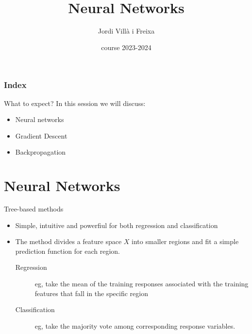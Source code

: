 \documentclass{beamer}
\title[Neural Networks]{Neural Networks} %
\author{Jordi Villà i Freixa} %
\institute[FCTE] %
{
Universitat de Vic - Universitat Central de Catalunya \\
Study Abroad\\ %
\medskip
\textit{jordi.villa@uvic.cat} %
}
\date{course 2023-2024}
\begin{document}
\begin{frame}
\titlepage %
\end{frame}

\begin{frame}
\frametitle{Index} %
\tableofcontents %
\end{frame}



\begin{frame}{What to expect?}
  In this session we will discuss:
  \begin{itemize}
    \item Neural networks
    \item Gradient Descent
    \item Backpropagation
  \end{itemize}
\end{frame}

\section{Neural Networks}


\begin{frame}{Tree-based methods}
\begin{itemize}
    \item Simple, intuitive and powerfiul for both regression and classification
    \item The method divides a feature space $X$ into smaller regions and fit a simple prediction function for each region.
    \begin{description}
        \item[Regression] eg, take the mean of the training responses associated with the training features that fall in the specific region
        \item[Classification] eg, take the majority vote among corresponding response variables.
    \end{description}
\end{itemize}
\end{frame}
\end{document}
